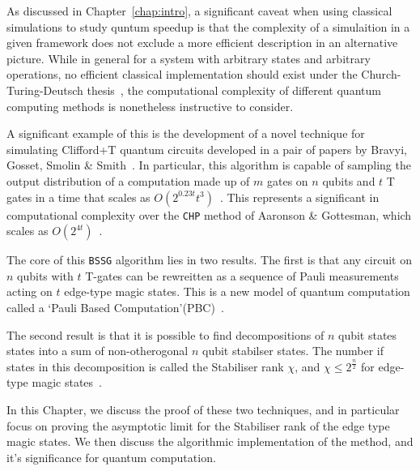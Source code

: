 \documentclass{standalone}
\begin{document}
As discussed in Chapter~\ref{chap:intro}, a significant caveat when using classical simulations to study quntum speedup is that the complexity of a simulaition in a given framework does not exclude a more efficient description in an alternative picture. While in general for a system with arbitrary states and arbitrary operations, no efficient classical implementation should exist under the Church-Turing-Deutsch thesis~\cite{Deutsch1985}, the computational complexity of different quantum computing methods is nonetheless instructive to consider. 
\par
A significant example of this is the development of a novel technique for simulating Clifford+T quantum circuits developed in a pair of papers by Bravyi, Gosset, Smolin \& Smith~\cite{Bravyi2015,Bravyi2016b}. In particular, this algorithm is capable of sampling the output distribution of a computation made up of $m$ gates on $n$ qubits and $t$ T gates in a time that scales as $O(2^{0.23t}t^{3})$~\cite{Bravyi2016b}. This represents a significant in computational complexity over the \texttt{CHP} method of Aaronson \& Gottesman, which scales as $O(2^{4t})$~\cite{Aaronson2004a}.
\par
The core of this \texttt{BSSG} algorithm lies in two results. The first is that any circuit on $n$ qubits with $t$ T-gates can be rewreitten as a sequence of Pauli measurements acting on $t$ edge-type magic states. This is a new model of quantum computation called a `Pauli Based Computation'(PBC)~\cite{Bravyi2015}. 
\par
The second result is that it is possible to find decompositions of $n$ qubit states states into a sum of non-otherogonal $n$ qubit stabilser states. The number if states in this decomposition is called the Stabiliser rank $\chi$, and $\chi\leq2^{\frac{n}{2}}$ for edge-type magic states~\cite{Bravyi2016b,Bravyi2015}.
\par
In this Chapter, we discuss the proof of these two techniques, and in particular focus on proving the asymptotic limit for the Stabiliser rank of the edge type magic states. We then discuss the algorithmic implementation of the method, and it's significance for quantum computation. 
\end{document}
